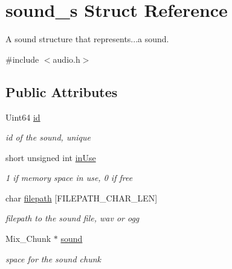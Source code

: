 \hypertarget{structsound__s}{}\section{sound\+\_\+s Struct Reference}
\label{structsound__s}


A sound structure that represents...a sound.  




{\ttfamily \#include $<$audio.\+h$>$}

\subsection*{Public Attributes}
\begin{DoxyCompactItemize}
\item 
\mbox{\label{structsound__s_a2f7e13cc9fb0c3f0c4ee04ed6047035b}} 
Uint64 \hyperlink{structsound__s_a2f7e13cc9fb0c3f0c4ee04ed6047035b}{id}
\begin{DoxyCompactList}\small\item\em id of the sound, unique \end{DoxyCompactList}\item 
\mbox{\label{structsound__s_a9408151d72733b3365d20df4f0c79122}} 
short unsigned int \hyperlink{structsound__s_a9408151d72733b3365d20df4f0c79122}{in\+Use}
\begin{DoxyCompactList}\small\item\em 1 if memory space in use, 0 if free \end{DoxyCompactList}\item 
\mbox{\label{structsound__s_a67aa7fa8339fd9db841aa18a914d6a4f}} 
char \hyperlink{structsound__s_a67aa7fa8339fd9db841aa18a914d6a4f}{filepath} \mbox{[}F\+I\+L\+E\+P\+A\+T\+H\+\_\+\+C\+H\+A\+R\+\_\+\+L\+EN\mbox{]}
\begin{DoxyCompactList}\small\item\em filepath to the sound file, wav or ogg \end{DoxyCompactList}\item 
\mbox{\label{structsound__s_a7ad81e5b32667e8ab848cb2366e2e852}} 
Mix\+\_\+\+Chunk $\ast$ \hyperlink{structsound__s_a7ad81e5b32667e8ab848cb2366e2e852}{sound}
\begin{DoxyCompactList}\small\item\em space for the sound chunk \end{DoxyCompactList}\item 

\end{DoxyCompactItemize}
